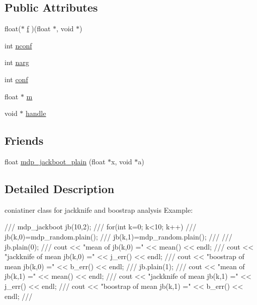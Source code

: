 \subsection*{Public Attributes}
\begin{DoxyCompactItemize}
\item 
float($\ast$ \hyperlink{classmdp__jackboot_a5cb1c13dadb2d351c217925f2ba0748e}{f} )(float $\ast$, void $\ast$)
\item 
int \hyperlink{classmdp__jackboot_a584457952e56b7deb3bea2f7b1f801d2}{nconf}
\item 
int \hyperlink{classmdp__jackboot_a455155a1460bacf19f95a3c1a3732714}{narg}
\item 
int \hyperlink{classmdp__jackboot_ae84ce36555fb3089989232ca91d80e15}{conf}
\item 
float $\ast$ \hyperlink{classmdp__jackboot_a8f586ad6739906a0d3c8c1aba3a9886b}{m}
\item 
void $\ast$ \hyperlink{classmdp__jackboot_acb66568807fa4180f1c55c05d87e8cca}{handle}
\end{DoxyCompactItemize}
\subsection*{Friends}
\begin{DoxyCompactItemize}
\item 
float \hyperlink{classmdp__jackboot_ad5b6e252253804e3e371008fbad7b43a}{mdp\_\-jackboot\_\-plain} (float $\ast$x, void $\ast$a)
\end{DoxyCompactItemize}


\subsection{Detailed Description}
coniatiner class for jackknife and boostrap analysis Example: \begin{DoxyVerb}
///    mdp_jackboot jb(10,2);
///    for(int k=0; k<10; k++) {       
///       jb(k,0)=mdp_random.plain();
///       jb(k,1)=mdp_random.plain();
///    }
///    jb.plain(0);
///    cout << "mean of jb(k,0) =" << mean() << endl;
///    cout << "jackknife of mean jb(k,0) =" << j_err() << endl;
///    cout << "boostrap of mean jb(k,0) =" << b_err() << endl;
///    jb.plain(1);
///    cout << "mean of jb(k,1) =" << mean() << endl;
///    cout << "jackknife of mean jb(k,1) =" << j_err() << endl;
///    cout << "boostrap of mean jb(k,1) =" << b_err() << endl;
/// \end{DoxyVerb}
 

